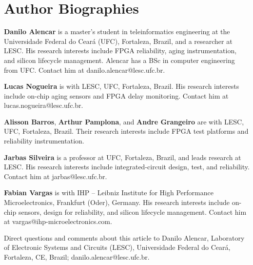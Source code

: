 \documentclass[10pt,twocolumn]{article}
\begin{document}
\section*{Author Biographies}
\footnotesize
\noindent\textbf{Danilo Alencar} is a master's student in teleinformatics engineering at the Universidade Federal do Cear\'a (UFC), Fortaleza, Brazil, and a researcher at LESC. His research interests include FPGA reliability, aging instrumentation, and silicon lifecycle management. Alencar has a BSc in computer engineering from UFC. Contact him at danilo.alencar@lesc.ufc.br.

\smallskip\noindent\textbf{Lucas Nogueira} is with LESC, UFC, Fortaleza, Brazil. His research interests include on-chip aging sensors and FPGA delay monitoring. Contact him at lucas.nogueira@lesc.ufc.br.

\smallskip\noindent\textbf{Alisson Barros}, \textbf{Arthur Pamplona}, and \textbf{Andre Grangeiro} are with LESC, UFC, Fortaleza, Brazil. Their research interests include FPGA test platforms and reliability instrumentation.

\smallskip\noindent\textbf{Jarbas Silveira} is a professor at UFC, Fortaleza, Brazil, and leads research at LESC. His research interests include integrated-circuit design, test, and reliability. Contact him at jarbas@lesc.ufc.br.

\smallskip\noindent\textbf{Fabian Vargas} is with IHP -- Leibniz Institute for High Performance Microelectronics, Frankfurt (Oder), Germany. His research interests include on-chip sensors, design for reliability, and silicon lifecycle management. Contact him at vargas@ihp-microelectronics.com.

\medskip\noindent Direct questions and comments about this article to Danilo Alencar, Laboratory of Electronic Systems and Circuits (LESC), Universidade Federal do Cear\'a, Fortaleza, CE, Brazil; danilo.alencar@lesc.ufc.br.
\end{document}
